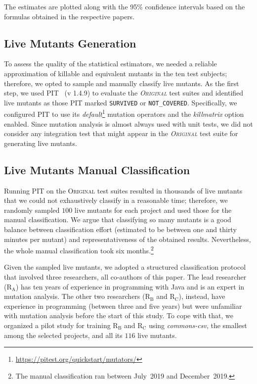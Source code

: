\documentclass[sigconf,review,anonymous]{acmart}
\newcommand{\projectCount}{ten\xspace}
\newcommand{\rA}{\textsc{R$_\text{A}$}\xspace}
\newcommand{\rB}{\textsc{R$_\text{B}$}\xspace}
\newcommand{\rC}{\textsc{R$_\text{C}$}\xspace}
\newcommand{\original}{\textsc{Original}\xspace}
\newcommand{\PIT}{\textsc{PIT}\xspace}
\begin{document}
The estimates are plotted along with the 95\% confidence intervals based on the
formulas obtained in the respective papers.

\subsection{Live Mutants Generation}
\label{sec:mutant-generation}
To assess the quality of the statistical estimators, we needed a reliable approximation of
killable and equivalent mutants in the \projectCount test subjects; therefore, we opted to
sample and manually classify live mutants.
%
As the first step, we used \PIT~\cite{pit} (v 1.4.9) to evaluate the \emph{\original} test suites
and identified live mutants as those \PIT marked \texttt{SURVIVED} or \texttt{NOT\_COVERED}.
%
Specifically, we configured \PIT to use its \emph{default}\footnote{\url{https://pitest.org/quickstart/mutators/}}
mutation operators and the \emph{killmatrix} option enabled.
%
Since mutation analysis is almost always used with unit
tests, we did not consider any integration test that might appear
in the \emph{\original} test suite for generating live mutants.

\subsection{Live Mutants Manual Classification}
\label{sec:mutant-classification}
Running \PIT on the \original test suites resulted in thousands of live mutants
that we could not exhaustively classify in a reasonable time; therefore, we randomly
sampled $100$ live mutants for each project and used those 
for the manual classification.
%
We argue that classifying so many mutants is a good balance between classification
effort (estimated to be between one and thirty minutes per mutant) and representativeness 
of the obtained results. Nevertheless, the whole manual classification took six months.\footnote{The manual classification ran between July~2019 and December~2019.}

Given the sampled live mutants, we adopted a structured classification protocol
that involved three researchers, all co-authors of this paper.
%
The lead researcher (\rA) has ten years of experience in programming with Java and is
an expert in mutation analysis. The other two researchers (\rB and \rC), 
instead, have experience in programming (between three and five years) 
but were unfamiliar with mutation analysis before the start of this study.
%
To cope with that, we organized a pilot study for training \rB and \rC
using \emph{commons-csv}, the smallest among the selected projects, 
and all its $116$ live mutants.
\end{document}
